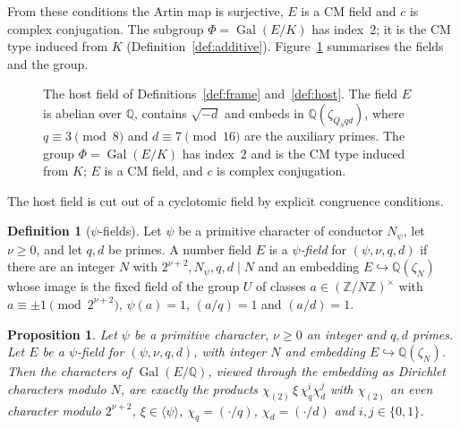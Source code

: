 \documentclass[11pt]{amsbook}
\theoremstyle{plain}
\newtheorem{proposition}[theorem]{Proposition}
\theoremstyle{definition}
\newtheorem{definition}[theorem]{Definition}
\theoremstyle{remark}
\numberwithin{equation}{section}
\numberwithin{figure}{chapter}
\numberwithin{table}{chapter}
\newcommand{\Q}{\mathbb{Q}}
\newcommand{\Z}{\mathbb{Z}}
\newcommand{\Gal}{\operatorname{Gal}}
\begin{document}
From these conditions the Artin map is surjective, $E$ is a CM field
and $c$ is complex conjugation. The subgroup $\Phi=\Gal(E/K)$ has
index~$2$; it is the CM type induced from $K$
(Definition~\ref{def:additive}). Figure~\ref{fig:hosttower} summarises
the fields and the group.

\begin{figure}[htbp]
\centering

\caption{The host field of Definitions~\ref{def:frame}
and~\ref{def:host}. The field $E$ is abelian over $\Q$, contains
$\sqrt{-d}$ and embeds in $\Q(\zeta_{Q_Sqd})$, where $q\equiv3\pmod8$
and $d\equiv7\pmod{16}$ are the auxiliary primes. The group
$\Phi=\Gal(E/K)$ has index~$2$ and is the CM type induced from $K$;
$E$ is a CM field, and $c$ is complex conjugation.}
\label{fig:hosttower}
\end{figure}

The host field is cut out of a cyclotomic field by explicit congruence
conditions.

\begin{definition}[$\psi$-fields]\label{def:psifield}
Let $\psi$ be a primitive character of conductor $N_\psi$, let
$\nu\ge0$, and let $q,d$ be primes. A number field $E$ is a
\emph{$\psi$-field} for $(\psi,\nu,q,d)$ if there are an integer $N$
with $2^{\nu+2},N_\psi,q,d\mid N$ and an embedding
$E\hookrightarrow\Q(\zeta_N)$ whose image is the fixed field of the
group $U$ of classes $a\in(\Z/N\Z)^\times$ with
$a\equiv\pm1\pmod{2^{\nu+2}}$, $\psi(a)=1$, $(a/q)=1$ and $(a/d)=1$.
\end{definition}

\begin{proposition}\label{prop:psifield-chars}
Let $\psi$ be a primitive character, $\nu\ge0$ an integer and $q,d$
primes. Let $E$ be a $\psi$-field for $(\psi,\nu,q,d)$, with integer
$N$ and embedding $E\hookrightarrow\Q(\zeta_N)$. Then the characters of
$\Gal(E/\Q)$, viewed through the embedding as Dirichlet characters
modulo $N$, are exactly
the products $\chi_{(2)}\,\xi\,\chi_q^i\chi_d^j$ with $\chi_{(2)}$ an
even character modulo $2^{\nu+2}$, $\xi\in\langle\psi\rangle$,
$\chi_q=(\cdot/q)$, $\chi_d=(\cdot/d)$ and $i,j\in\{0,1\}$.
\end{proposition}
\end{document}
